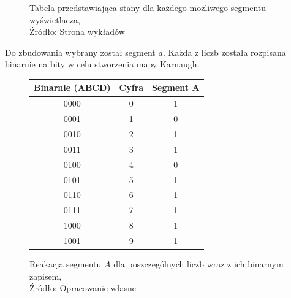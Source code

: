 \documentclass{article}
\begin{document}
\begin{figure}[!ht]
\begin{minipage}{.5\textwidth}
        \caption{Tabela przedstawiająca stany dla każdego możliwego segmentu wyświetlacza,
        \\Źródło: \href{https://spe.if.uj.edu.pl/literatura}{Strona wykładów}}
          \end{minipage}
      \end{figure}

      Do zbudowania wybrany został segment $a$. Każda z liczb została rozpisana binarnie na bity w celu stworzenia mapy Karnaugh.

      \begin{figure}[!ht]
        \begin{minipage}{.5\textwidth}
            \centering
            \begin{tabular}{|c|c|c|}
            \hline
            \textbf{Binarnie (ABCD)} & \textbf{Cyfra} & \textbf{Segment A} \\
            \hline
            0000 & 0 & 1 \\
            \hline
            0001 & 1 & 0 \\
            \hline
            0010 & 2 & 1 \\
            \hline
            0011 & 3 & 1 \\
            \hline
            0100 & 4 & 0 \\
            \hline
            0101 & 5 & 1 \\
            \hline
            0110 & 6 & 1 \\
            \hline
            0111 & 7 & 1 \\
            \hline
            1000 & 8 & 1 \\
            \hline
            1001 & 9 & 1 \\
            \hline
            \end{tabular}
            \caption{Reakacja segmentu $A$ dla poszczególnych liczb wraz z ich binarnym zapisem,
            \\Źródło: Opracowanie własne}
        \end{minipage}
        \begin{minipage}{.5\textwidth}
          \centering

\end{minipage}
\end{figure}
\end{document}
